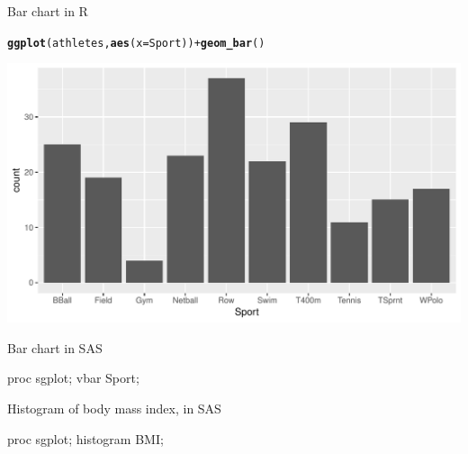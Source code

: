 \documentclass[unknownkeysallowed]{beamer}\usepackage[]{graphicx}\usepackage[]{color}
\makeatletter
\def\maxwidth{ %
  \ifdim\Gin@nat@width>\linewidth
    \linewidth
  \else
    \Gin@nat@width
  \fi
}
\newcommand{\hlopt}[1]{\textcolor[rgb]{0,0,0}{#1}}%
\newcommand{\hlstd}[1]{\textcolor[rgb]{0.345,0.345,0.345}{#1}}%
\newcommand{\hlkwc}[1]{\textcolor[rgb]{0.333,0.667,0.333}{#1}}%
\newcommand{\hlkwd}[1]{\textcolor[rgb]{0.737,0.353,0.396}{\textbf{#1}}}%
\newenvironment{kframe}{%
 \def\at@end@of@kframe{}%
 \ifinner\ifhmode%
  \def\at@end@of@kframe{\end{minipage}}%
  \begin{minipage}{\columnwidth}%
 \fi\fi%
 \def\FrameCommand##1{\hskip\@totalleftmargin \hskip-\fboxsep
 \colorbox{shadecolor}{##1}\hskip-\fboxsep
     \hskip-\linewidth \hskip-\@totalleftmargin \hskip\columnwidth}%
 \MakeFramed {\advance\hsize-\width
   \@totalleftmargin\z@ \linewidth\hsize
   \@setminipage}}%
 {\par\unskip\endMakeFramed%
 \at@end@of@kframe}
\newenvironment{knitrout}{}{} %
\makeatother
\begin{document}
\begin{frame}[fragile]{Bar chart in R}
  
\begin{knitrout}
\color{fgcolor}\begin{kframe}
\begin{alltt}
\hlkwd{ggplot}\hlstd{(athletes,}\hlkwd{aes}\hlstd{(}\hlkwc{x}\hlstd{=Sport))}\hlopt{+}\hlkwd{geom_bar}\hlstd{()}
\end{alltt}
\end{kframe}
\includegraphics[width=\maxwidth]{figure/unnamed-chunk-27-1} 

\end{knitrout}
  
\end{frame}

\begin{frame}[fragile]{Bar chart in SAS}
  
  \begin{Sascode}[store=gd]
proc sgplot;
  vbar Sport;
  \end{Sascode}
  
  
\end{frame}

\begin{frame}[fragile]{Histogram of body mass index, in SAS}
  
  \begin{Sascode}[store=ge]
proc sgplot;
  histogram BMI;
  \end{Sascode}
  

  
\end{frame}
\end{document}
